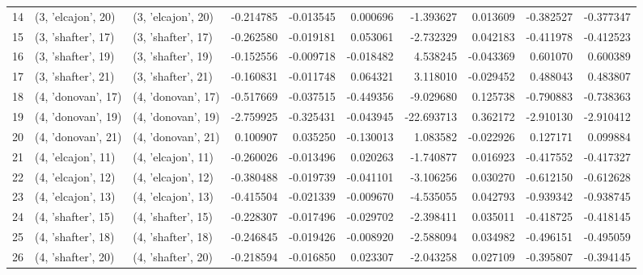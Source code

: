 \begin{tabular}{lllrrrrrrr}
14 &  (3, 'elcajon', 20) &  (3, 'elcajon', 20) & -0.214785 &  -0.013545 &  0.000696 &  -1.393627 &  0.013609 &  -0.382527 & -0.377347 \\
15 &  (3, 'shafter', 17) &  (3, 'shafter', 17) & -0.262580 &  -0.019181 &  0.053061 &  -2.732329 &  0.042183 &  -0.411978 & -0.412523 \\
16 &  (3, 'shafter', 19) &  (3, 'shafter', 19) & -0.152556 &  -0.009718 & -0.018482 &   4.538245 & -0.043369 &   0.601070 &  0.600389 \\
17 &  (3, 'shafter', 21) &  (3, 'shafter', 21) & -0.160831 &  -0.011748 &  0.064321 &   3.118010 & -0.029452 &   0.488043 &  0.483807 \\
18 &  (4, 'donovan', 17) &  (4, 'donovan', 17) & -0.517669 &  -0.037515 & -0.449356 &  -9.029680 &  0.125738 &  -0.790883 & -0.738363 \\
19 &  (4, 'donovan', 19) &  (4, 'donovan', 19) & -2.759925 &  -0.325431 & -0.043945 & -22.693713 &  0.362172 &  -2.910130 & -2.910412 \\
20 &  (4, 'donovan', 21) &  (4, 'donovan', 21) &  0.100907 &   0.035250 & -0.130013 &   1.083582 & -0.022926 &   0.127171 &  0.099884 \\
21 &  (4, 'elcajon', 11) &  (4, 'elcajon', 11) & -0.260026 &  -0.013496 &  0.020263 &  -1.740877 &  0.016923 &  -0.417552 & -0.417327 \\
22 &  (4, 'elcajon', 12) &  (4, 'elcajon', 12) & -0.380488 &  -0.019739 & -0.041101 &  -3.106256 &  0.030270 &  -0.612150 & -0.612628 \\
23 &  (4, 'elcajon', 13) &  (4, 'elcajon', 13) & -0.415504 &  -0.021339 & -0.009670 &  -4.535055 &  0.042793 &  -0.939342 & -0.938745 \\
24 &  (4, 'shafter', 15) &  (4, 'shafter', 15) & -0.228307 &  -0.017496 & -0.029702 &  -2.398411 &  0.035011 &  -0.418725 & -0.418145 \\
25 &  (4, 'shafter', 18) &  (4, 'shafter', 18) & -0.246845 &  -0.019426 & -0.008920 &  -2.588094 &  0.034982 &  -0.496151 & -0.495059 \\
26 &  (4, 'shafter', 20) &  (4, 'shafter', 20) & -0.218594 &  -0.016850 &  0.023307 &  -2.043258 &  0.027109 &  -0.395807 & -0.394145 \\
\bottomrule
\end{tabular}
